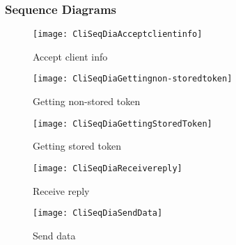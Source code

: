 	\subsubsection{Sequence Diagrams}\label{client sequence diagrams}
		\begin{figure}[H]
			\centering	
			\texttt{[image: CliSeqDiaAcceptclientinfo]}
			\caption{Accept client info}
			\label{fig:CliSeqDiaAcceptclientinfo}
		\end{figure}
		\begin{figure}[H]
			\centering	
			\texttt{[image: CliSeqDiaGettingnon-storedtoken]}
			\caption{Getting non-stored token}
			\label{fig:CliSeqDiaGettingnon-storedtoken}
		\end{figure}
		\begin{figure}[H]
			\centering	
			\texttt{[image: CliSeqDiaGettingStoredToken]}
			\caption{Getting stored token}
			\label{fig:CliSeqDiaGettingStoredToken}
		\end{figure}
		\begin{figure}[H]
			\centering	
			\texttt{[image: CliSeqDiaReceivereply]}
			\caption{Receive reply}
			\label{fig:CliSeqDiaReceivereply}
		\end{figure}
		\begin{figure}[H]
			\centering	
			\texttt{[image: CliSeqDiaSendData]}
			\caption{Send data}
			\label{fig:CliSeqDiaSendData}
		\end{figure}

		

